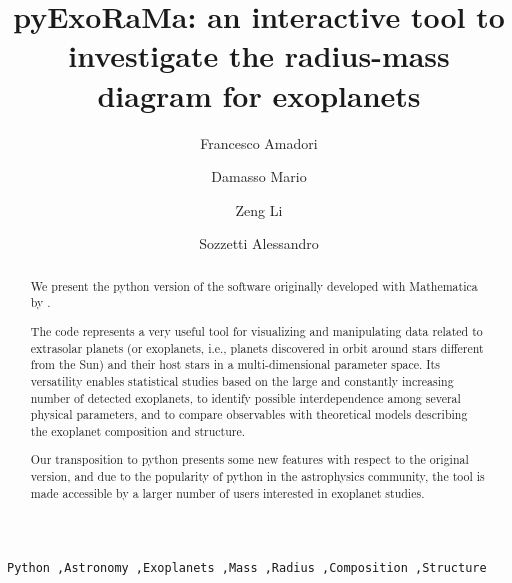 \documentclass[preprint,12pt]{elsarticle}
\begin{document}
	
	\begin{frontmatter}
		
		\title{pyExoRaMa: an interactive tool to investigate the radius-mass diagram for exoplanets}
		
		\author[mymainaddress]{Francesco Amadori}
		
		\author[mymainaddress]{Damasso Mario}
		
		\author[address1,address2]{Zeng Li}

		\author[mymainaddress]{Sozzetti Alessandro}
		
		\address[mymainaddress]{INAF-Astrophysical Observatory of Torino, Via Osservatorio 20, Pino T.se (To) 10025, Italy}
		
		\address[address1]{Department of Earth and Planetary Sciences, Harvard University, 20 Oxford Street, Cambridge, MA 02138, USA}

		\address[address2]{Harvard-Smithsonian Center for Astrophysics, 60 Garden Street, Cambridge, MA 02138, USA}
		
		\begin{abstract}
			We present the python version of the software originally developed with Mathematica by \textit{\cite{Zeng2021}}. 

			The code represents a very useful tool for visualizing and manipulating data related to extrasolar planets (or exoplanets, i.e., planets discovered in orbit around stars different from the Sun) and their host stars in a multi-dimensional parameter space. 
			Its versatility enables statistical studies based on the large and constantly increasing number of detected exoplanets, to identify possible interdependence among several physical parameters, and to compare observables with theoretical models describing the exoplanet composition and structure.

			Our transposition to python presents some new features with respect to the original version, and due to the popularity of python in the astrophysics community, the tool is made accessible by a larger number of users interested in exoplanet studies.
			
		\end{abstract}
		
		\begin{keyword}
			\texttt{Python \sep Astronomy \sep Exoplanets \sep Mass \sep Radius \sep Composition \sep Structure}
		\end{keyword}       
		
	\end{frontmatter}
	
\end{document}
